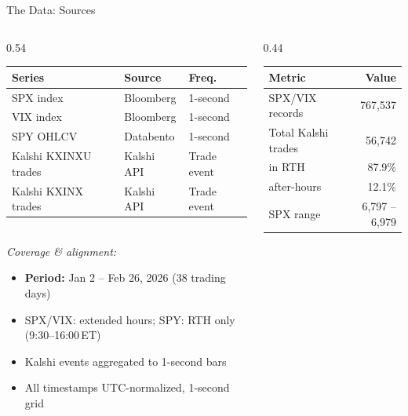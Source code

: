 \documentclass[aspectratio=169]{beamer}
\begin{document}
\begin{frame}[shrink=5]{The Data: Sources}
  \begin{columns}[T,onlytextwidth]
    \begin{column}{0.54\textwidth}
      \small
      \begin{tabular}{@{}lll@{}}
        \toprule
        \textbf{Series} & \textbf{Source} & \textbf{Freq.} \\
        \midrule
        SPX index            & Bloomberg  & 1-second \\
        VIX index            & Bloomberg  & 1-second \\
        SPY OHLCV            & Databento  & 1-second \\
        Kalshi KXINXU trades & Kalshi API & Trade event \\
        Kalshi KXINX trades  & Kalshi API & Trade event \\
        \bottomrule
      \end{tabular} \\
      \vspace{0.3em}
      \footnotesize\textit{Coverage \& alignment:}
      \begin{itemize}\footnotesize
        \item \textbf{Period:} Jan 2 -- Feb 26, 2026 (38 trading days)
        \item SPX/VIX: extended hours; SPY: RTH only (9:30--16:00\,ET)
        \item Kalshi events aggregated to 1-second bars
        \item All timestamps UTC-normalized, 1-second grid
      \end{itemize}
    \end{column}
    \begin{column}{0.44\textwidth}
      \small
      \begin{tabular}{@{}lr@{}}
        \toprule
        \textbf{Metric} & \textbf{Value} \\
        \midrule
        SPX/VIX records      & 767,537 \\
        Total Kalshi trades  & 56,742 \\
        \quad in RTH         & 87.9\% \\
        \quad after-hours    & 12.1\% \\
        \midrule
        SPX range            & 6,797 -- 6,979 \\

\end{tabular}
\end{column}
\end{columns}
\end{frame}
\end{document}
